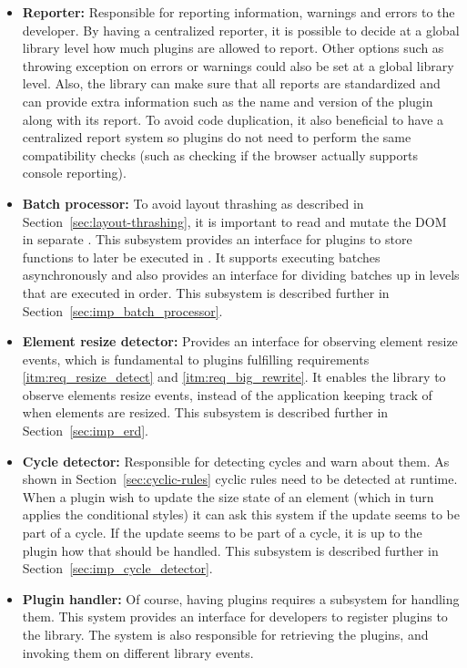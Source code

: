\documentclass[a4paper,11pt]{kth-mag}
\begin{document}
      \begin{itemize}
        \item \textbf{Reporter:}
          Responsible for reporting information, warnings and errors to the developer.
          By having a centralized reporter, it is possible to decide at a global library level how much plugins are allowed to report.
          Other options such as throwing exception on errors or warnings could also be set at a global library level.
          Also, the library can make sure that all reports are standardized and can provide extra information such as the name and version of the plugin along with its report.
          To avoid code duplication, it also beneficial to have a centralized report system so plugins do not need to perform the same compatibility checks (such as checking if the \gls{browser} actually supports console reporting).
        \item \textbf{Batch processor:}
          To avoid \gls{layout thrashing} as described in Section~\ref{sec:layout-thrashing}, it is important to read and mutate the \gls{DOM} in separate .
          This subsystem provides an interface for plugins to store functions to later be executed in .
          It supports executing batches asynchronously and also provides an interface for dividing batches up in levels that are executed in order.
          This subsystem is described further in Section~\ref{sec:imp_batch_processor}.
        \item \textbf{Element resize detector:}
          Provides an interface for observing \gls{element} resize events, which is fundamental to plugins fulfilling requirements \ref{itm:req_resize_detect} and \ref{itm:req_big_rewrite}.
          It enables the library to observe \glspl{element} resize events, instead of the application keeping track of when \glspl{element} are resized.
          This subsystem is described further in Section~\ref{sec:imp_erd}.
        \item \textbf{Cycle detector:}
          Responsible for detecting cycles and warn about them.
          As shown in Section~\ref{sec:cyclic-rules} cyclic rules need to be detected at runtime.
          When a plugin wish to update the size state of an \gls{element} (which in turn applies the conditional styles) it can ask this system if the update seems to be part of a cycle.
          If the update seems to be part of a cycle, it is up to the plugin how that should be handled.
          This subsystem is described further in Section~\ref{sec:imp_cycle_detector}.
        \item \textbf{Plugin handler:}
          Of course, having plugins requires a subsystem for handling them.
          This system provides an interface for developers to register plugins to the library.
          The system is also responsible for retrieving the plugins, and invoking them on different library events.
      \end{itemize}
\end{document}

